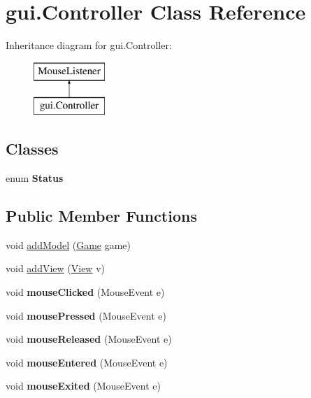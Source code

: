 \hypertarget{classgui_1_1_controller}{}\section{gui.\+Controller Class Reference}
\label{classgui_1_1_controller}
Inheritance diagram for gui.\+Controller\+:\begin{figure}[H]
\begin{center}
\leavevmode
\includegraphics[height=2.000000cm]{classgui_1_1_controller}
\end{center}
\end{figure}
\subsection*{Classes}
\begin{DoxyCompactItemize}
\item 
enum {\bfseries Status}
\end{DoxyCompactItemize}
\subsection*{Public Member Functions}
\begin{DoxyCompactItemize}
\item 
void \mbox{\hyperlink{classgui_1_1_controller_a1b2b2a3f3ae423f0469883a0a67fa6d0}{add\+Model}} (\mbox{\hyperlink{classgui_1_1_game}{Game}} game)
\item 
void \mbox{\hyperlink{classgui_1_1_controller_a0bd70d2ab1480738e959182941b5acfb}{add\+View}} (\mbox{\hyperlink{classgui_1_1_view}{View}} v)
\item 
\mbox{\label{classgui_1_1_controller_ad8cde38fdfb1d4970fa5e90de0ec6a6d}} 
void {\bfseries mouse\+Clicked} (Mouse\+Event e)
\item 
\mbox{\label{classgui_1_1_controller_ab6c53d3d937195014480c6059c8662c6}} 
void {\bfseries mouse\+Pressed} (Mouse\+Event e)
\item 
\mbox{\label{classgui_1_1_controller_a55253c9f746f7389d60ad945c872f6c7}} 
void {\bfseries mouse\+Released} (Mouse\+Event e)
\item 
\mbox{\label{classgui_1_1_controller_a860ac5f664f72e3e9897ff4e2332d1b7}} 
void {\bfseries mouse\+Entered} (Mouse\+Event e)
\item 
\mbox{\label{classgui_1_1_controller_a6399d66d0d86fbcf38734f448331c251}} 
void {\bfseries mouse\+Exited} (Mouse\+Event e)
\end{DoxyCompactItemize}


